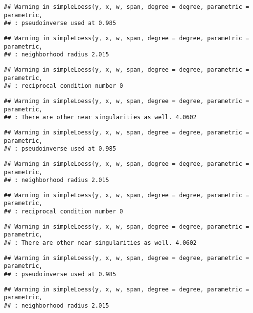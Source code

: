 \documentclass[
]{article}
\begin{document}
\begin{verbatim}
## Warning in simpleLoess(y, x, w, span, degree = degree, parametric = parametric,
## : pseudoinverse used at 0.985
\end{verbatim}

\begin{verbatim}
## Warning in simpleLoess(y, x, w, span, degree = degree, parametric = parametric,
## : neighborhood radius 2.015
\end{verbatim}

\begin{verbatim}
## Warning in simpleLoess(y, x, w, span, degree = degree, parametric = parametric,
## : reciprocal condition number 0
\end{verbatim}

\begin{verbatim}
## Warning in simpleLoess(y, x, w, span, degree = degree, parametric = parametric,
## : There are other near singularities as well. 4.0602
\end{verbatim}

\begin{verbatim}
## Warning in simpleLoess(y, x, w, span, degree = degree, parametric = parametric,
## : pseudoinverse used at 0.985
\end{verbatim}

\begin{verbatim}
## Warning in simpleLoess(y, x, w, span, degree = degree, parametric = parametric,
## : neighborhood radius 2.015
\end{verbatim}

\begin{verbatim}
## Warning in simpleLoess(y, x, w, span, degree = degree, parametric = parametric,
## : reciprocal condition number 0
\end{verbatim}

\begin{verbatim}
## Warning in simpleLoess(y, x, w, span, degree = degree, parametric = parametric,
## : There are other near singularities as well. 4.0602
\end{verbatim}

\begin{verbatim}
## Warning in simpleLoess(y, x, w, span, degree = degree, parametric = parametric,
## : pseudoinverse used at 0.985
\end{verbatim}

\begin{verbatim}
## Warning in simpleLoess(y, x, w, span, degree = degree, parametric = parametric,
## : neighborhood radius 2.015
\end{verbatim}
\end{document}
